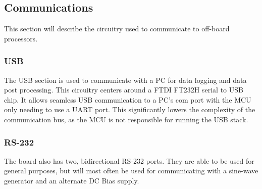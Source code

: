 \subsection{Communications}

This section will describe the circuitry used to communicate to off-board processors.

\subsubsection{USB}
The USB section is used to communicate with a PC for data logging and data post processing. This circuitry centers around a FTDI FT232H serial to USB chip. It allows seamless USB communication to a PC's com port with the MCU only needing to use a UART port. This significantly lowers the complexity of the communication bus, as the MCU is not responsible for running the USB stack.

\subsubsection{RS-232}
The board also has two, bidirectional RS-232 ports. They are able to be used for general purposes, but will most often be used for communicating with a sine-wave generator and an alternate DC Bias supply.

